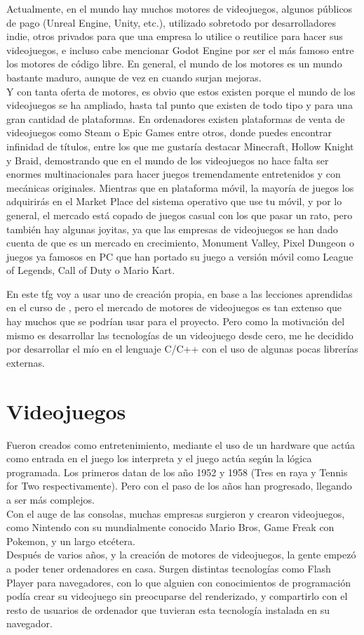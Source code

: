 Actualmente, en el mundo hay muchos motores de videojuegos, algunos públicos de pago (Unreal Engine, Unity, etc.), utilizado sobretodo por desarrolladores indie, otros privados para que una empresa lo utilice o reutilice para hacer sus videojuegos, e incluso cabe mencionar Godot Engine por ser el más famoso entre los motores de código libre. En general, el mundo de los motores es un mundo bastante maduro, aunque de vez en cuando surjan mejoras.
\\
Y con tanta oferta de motores, es obvio que estos existen porque el mundo de los videojuegos se ha ampliado, hasta tal punto que existen de todo tipo y para una gran cantidad de plataformas. En ordenadores existen plataformas de venta de videojuegos como Steam o Epic Games entre otros, donde puedes encontrar infinidad de títulos, entre los que me gustaría destacar Minecraft, Hollow Knight y Braid, demostrando que en el mundo de los videojuegos no hace falta ser enormes multinacionales para hacer juegos tremendamente entretenidos y con mecánicas originales. Mientras que en plataforma móvil, la mayoría de juegos los adquirirás en el Market Place del sistema operativo que use tu móvil, y por lo general, el mercado está copado de juegos casual con los que pasar un rato, pero también hay algunas joyitas, ya que las empresas de videojuegos se han dado cuenta de que es un mercado en crecimiento, Monument Valley, Pixel Dungeon o juegos ya famosos en PC que han portado su juego a versión móvil como League of Legends, Call of Duty o Mario Kart.

En este \gls{tfg} voy a usar uno de creación propia, en base a las lecciones aprendidas en el curso de \citep{CursoMotorC++}, pero el mercado de motores de videojuegos es tan extenso que hay muchos que se podrían usar para el proyecto. Pero como la motivación del mismo es desarrollar las tecnologías de un videojuego desde cero, me he decidido por desarrollar el mío en el lenguaje C/C++ con el uso de algunas pocas librerías externas.

\section{Videojuegos}
Fueron creados como entretenimiento, mediante el uso de un hardware que actúa como entrada en el juego los interpreta y el juego actúa según la lógica programada. Los primeros datan de los año 1952 y 1958 (Tres en raya y Tennis for Two respectivamente). Pero con el paso de los años han progresado, llegando a ser más complejos. 
\\
Con el auge de las consolas, muchas empresas surgieron y crearon videojuegos, como Nintendo con su mundialmente conocido Mario Bros, Game Freak con Pokemon, y un largo etcétera. 
\\
Después de varios años, y la creación de motores de videojuegos, la gente empezó a poder tener ordenadores en casa. Surgen distintas tecnologías como Flash Player para navegadores, con lo que alguien con conocimientos de programación podía crear su videojuego sin preocuparse del renderizado, y compartirlo con el resto de usuarios de ordenador que tuvieran esta tecnología instalada en su navegador.

